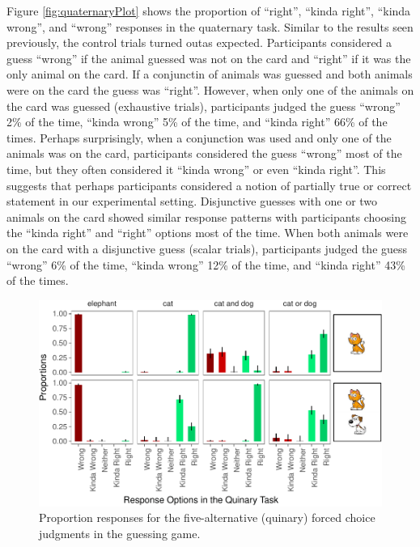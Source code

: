 \documentclass[floatsintext,man]{apa6}
\theoremstyle{definition}
\theoremstyle{definition}
\theoremstyle{definition}
\theoremstyle{remark}
\begin{document}
Figure \ref{fig:quaternaryPlot} shows the proportion of \enquote{right},
\enquote{kinda right}, \enquote{kinda wrong}, and \enquote{wrong}
responses in the quaternary task. Similar to the results seen
previously, the control trials turned outas expected. Participants
considered a guess \enquote{wrong} if the animal guessed was not on the
card and \enquote{right} if it was the only animal on the card. If a
conjunctin of animals was guessed and both animals were on the card the
guess was \enquote{right}. However, when only one of the animals on the
card was guessed (exhaustive trials), participants judged the guess
\enquote{wrong} 2\% of the time, \enquote{kinda wrong} 5\% of the time,
and \enquote{kinda right} 66\% of the times. Perhaps surprisingly, when
a conjunction was used and only one of the animals was on the card,
participants considered the guess \enquote{wrong} most of the time, but
they often considered it \enquote{kinda wrong} or even \enquote{kinda
right}. This suggests that perhaps participants considered a notion of
partially true or correct statement in our experimental setting.
Disjunctive guesses with one or two animals on the card showed similar
response patterns with participants choosing the \enquote{kinda right}
and \enquote{right} options most of the time. When both animals were on
the card with a disjunctive guess (scalar trials), participants judged
the guess \enquote{wrong} 6\% of the time, \enquote{kinda wrong} 12\% of
the time, and \enquote{kinda right} 43\% of the times.

\begin{figure}
\centering
\includegraphics{writeup_files/figure-latex/quinaryPlot-1.pdf}
\caption{\label{fig:quinaryPlot}Proportion responses for the
five-alternative (quinary) forced choice judgments in the guessing
game.}
\end{figure}
\end{document}
